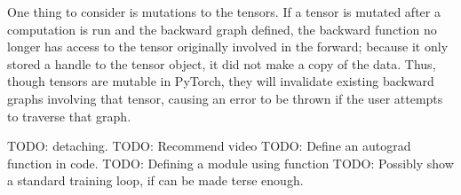 One thing to consider is mutations to the tensors.
If a tensor is mutated after a computation is run and the backward graph defined, the backward function no longer has access to the tensor originally involved in the forward; because it only stored a handle to the tensor object, it did not make a copy of the data. 
Thus, though tensors are mutable in PyTorch, they will invalidate existing backward graphs involving that tensor, causing an error to be thrown if the user attempts to traverse that graph.

TODO: detaching.
TODO: Recommend video
TODO: Define an autograd function in code.
TODO: Defining a module using function
TODO: Possibly show a standard training loop, if can be made terse enough.
